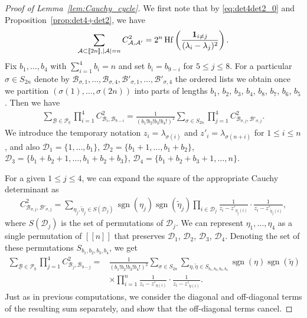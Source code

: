\documentclass[pdftex]{sigma}
\numberwithin{equation}{section}
\theoremstyle{definition}
\newcommand{\cP}{{\mathcal P}}
\newcommand{\ind}{{\bf{1}}}
\newcommand{\cB}{\mathcal{B}}
\newcommand{\sgn}{\operatorname{sgn}}
\newcommand{\Hf}{\operatorname{Hf}}
\newcommand{\cA}{\mathcal{A}}
\newcommand{\cD}{\mathcal{D}}
\newcommand{\lst}[1]{[\![#1 ]\!]}
\begin{document}
\begin{proof}[Proof of Lemma~\ref{lem:Cauchy_cycle}]
 We first note that by \eqref{eq:det4det2_0} and Proposition~\ref{prop:det4+det2}, we have
 \begin{align}\label{eq:C_Hf}
 \sum_{\cA\subset \lst{2n}, |\cA|=n} C_{\cA,\cA'}^2=2^n \Hf\left(\frac{\ind_{i\neq j}}{(\lambda_i-\lambda_j)^2}\right).
 \end{align}
Fix $b_1, \dots, b_4$ with $\sum_{i=1}^4 b_i=n$ and set $b_i=b_{9-i}$ for $5\le j\le 8$. For a particular $\sigma\in S_{2n}$ denote by $\cB_{\sigma,1}, \dots, \cB_{\sigma,4},\cB'_{\sigma,1}, \dots, \cB'_{\sigma,4}$ the ordered lists we obtain once we partition $(\sigma(1),\dots, \sigma(2n))$ into parts of lengths $b_1$, $b_2$, $b_3$, $b_4$, $b_8$, $b_7$, $b_6$, $b_5$. Then we have
\begin{align*}%
 \sum_{\underline{\cB}\in \cP_{\underline{b}}} \prod_{i=1}^4 C_{\cB_i,\cB_{9-i}}^2 =\frac{1}{(b_1! b_2! b_3! b_4!)^2}\sum_{\sigma\in S_{2n}} \prod_{j=1}^4 C_{\cB_{\sigma,j},\cB'_{\sigma,j}}^2.
\end{align*}
We introduce the temporary notation $z_i=\lambda_{\sigma(i)}$ and $z'_i=\lambda_{\sigma(n+i)}$ for $1\le i\le n$, and also $\cD_1=\{1,\dots, b_1\}$, $\cD_2=\{b_1+1,\dots, b_1+b_2\}$, $\cD_3=\{b_1+b_2+1, \dots, b_1+b_2+b_3\}$, $\cD_4=\{b_1+b_2+b_3+1,\dots,n\}$.

For a given $1\le j\le 4$, we can expand the square of the appropriate Cauchy determinant as
\begin{align*}
 C^2_{\cB_{\sigma,j},\cB'_{\sigma,j}}=\sum_{\eta_j, \tilde \eta_j\in S(\cD_j)} \sgn(\eta_j)\sgn(\tilde \eta_j) \prod_{i\in \cD_j} \frac{1}{z_i-z'_{\eta_j(i)}} \cdot \frac{1}{z_i-z'_{\tilde \eta_j(i)}},
\end{align*}
where $S(\cD_j)$ is the set of permutations of $\cD_j$.
We can represent $\eta_1,\dots, \eta_4$ as a single permutation of $\lst{n}$ that preserves $\cD_1$, $\cD_2$, $\cD_3$, $\cD_4$. Denoting the set of these permutations $S_{b_1,b_2,b_3,b_4}$, we get
\begin{align}
 \sum_{\underline{\cB}\in \cP_{\underline{b}}} \prod_{j=1}^4 C_{\cB_j,\cB_{9-j}}^2
 ={}&\frac{1}{(b_1! b_2! b_3! b_4!)^2}\sum_{\sigma\in S_{2n}} \sum_{\eta,\tilde \eta \in S_{b_1,b_2,b_3,b_4}}
 \sgn(\eta) \sgn(\tilde \eta) \nonumber\\
 & \times \prod_{i=1}^n \frac{1}{z_i-z'_{\eta(i)}}\cdot \frac{1}{z_i-z'_{\tilde \eta(i)}}.\label{eq:Cauchy_B4_1_2}
\end{align}
Just as in previous computations, we consider the diagonal and off-diagonal terms of the resulting sum separately, and show that the off-diagonal terms cancel.


\end{proof}
\end{document}
